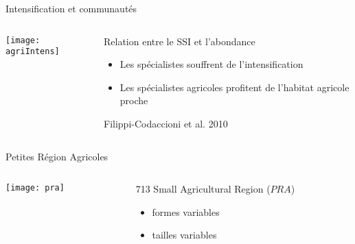 \documentclass[10pt]{beamer}
\begin{document}
\begin{frame}{Intensification et communautés}
 \begin{columns}[c]
    \begin{column}[c]{0.45\textwidth}
      \begin{center}
          \texttt{[image: agriIntens]}
      \end{center}
    \end{column}
    \begin{column}[c]{0.55\textwidth}
     Relation entre le SSI et l'abondance
      \begin{itemize}[<+->]
      \item <2-> Les spécialistes souffrent de l'intensification
      \item <3> Les spécialistes agricoles profitent de l'habitat agricole proche
      \end{itemize}
        \begin{tiny}
     Filippi-Codaccioni et al. 2010
  \end{tiny}
    \end{column}
  \end{columns}
\end{frame}


\begin{frame}{Petites Région Agricoles}
        
\begin{columns}[c]
 \begin{column}{.65\textwidth}
 \begin{center}
 
    \texttt{[image: pra]}
\end{center}
 \end{column}
\begin{column}{.45\textwidth}



 713 Small Agricultural Region ($PRA$)

\begin{itemize}
  \item formes variables
  \item tailles variables
 \end{itemize}
 
  \end{column}
\end{columns}
  \end{frame}
\end{document}
